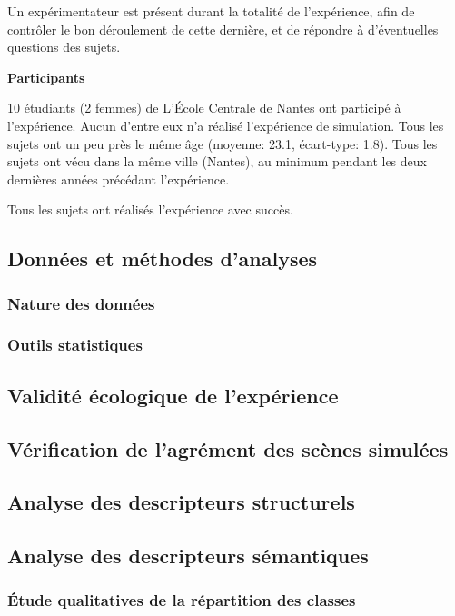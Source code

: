 Un expérimentateur est présent durant la totalité de l'expérience, afin de contrôler le bon déroulement de cette dernière, et de répondre à d'éventuelles questions des sujets. 

\textbf{Participants}

10 étudiants (2 femmes) de L’École Centrale de Nantes ont participé à l'expérience. Aucun d'entre eux n'a réalisé l'expérience de simulation. Tous les sujets ont un peu près le même âge (moyenne: 23.1, écart-type: 1.8). Tous les sujets ont vécu dans la même ville (Nantes), au minimum pendant les deux dernières années précédant l'expérience.

Tous les sujets ont réalisés l'expérience avec succès.

\subsection{Données et méthodes d'analyses}

\subsubsection{Nature des données}

\subsubsection{Outils statistiques}

\subsection{Validité écologique de l'expérience}

\subsection{Vérification de l'agrément des scènes simulées}

\subsection{Analyse des descripteurs structurels}

\subsection{Analyse des descripteurs sémantiques}

\subsubsection{Étude qualitatives de la répartition des classes}

